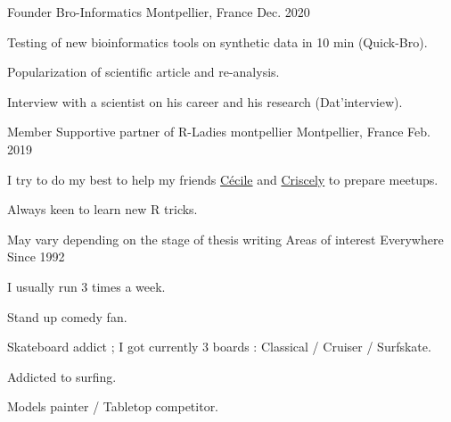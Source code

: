 

\begin{cventries}

  \cventry
    {Founder} %
    {Bro-Informatics} %
    {Montpellier, France} %
    {Dec. 2020} %
    {
      \begin{cvitems} %
        \item {Testing of new bioinformatics tools on synthetic data in 10 min (Quick-Bro).}
        \item {Popularization of scientific article and re-analysis.}
        \item {Interview with a scientist on his career and his research (Dat'interview).}
      \end{cvitems}
    }

  \cventry
    {Member} %
    {Supportive partner of R-Ladies montpellier} %
    {Montpellier, France} %
    {Feb. 2019} %
    {
      \begin{cvitems} %
        \item {I try to do my best to help my friends \href{https://github.com/cecilesauder}{Cécile} and \href{https://github.com/CriscelyLP}{Criscely} to prepare meetups.}
        \item {Always keen to learn new R tricks.}
      \end{cvitems}
    }
    
  \cventry
    {May vary depending on the stage of thesis writing} %
    {Areas of interest} %
    {Everywhere} %
    {Since 1992} %
    {
      \begin{cvitems} %
        \item {I usually run 3 times a week.}
        \item {Stand up comedy fan.}
        \item {Skateboard addict ; I got currently 3 boards : Classical / Cruiser / Surfskate.}
        \item {Addicted to surfing.}
        \item {Models painter / Tabletop competitor.}
      \end{cvitems}
    }

\end{cventries}
